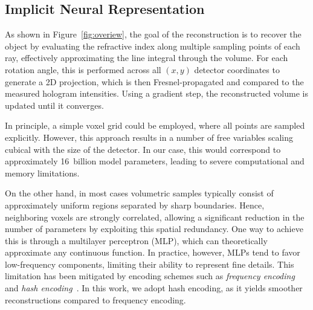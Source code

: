 \documentclass{article}
\begin{document}
\subsection{Implicit Neural Representation}
As shown in Figure~\ref{fig:overiew}, the goal of the reconstruction is to recover the object by evaluating the refractive index along multiple sampling points of each ray, effectively approximating the line integral through the volume. 
For each rotation angle, this is performed across all $\left( x,y \right)$ detector coordinates to generate a 2D projection, which is then Fresnel-propagated and compared to the measured hologram intensities.
Using a gradient step, the reconstructed volume is updated until it converges.

In principle, a simple voxel grid could be employed, where all points are sampled explicitly.  
However, this approach results in a number of free variables scaling cubical with the size of the detector.  
In our case, this would correspond to approximately 16~billion model parameters, leading to severe computational and memory limitations.  

On the other hand, in most cases volumetric samples typically consist of approximately uniform regions separated by sharp boundaries.  
Hence, neighboring voxels are strongly correlated, allowing a significant reduction in the number of parameters by exploiting this spatial redundancy.  
One way to achieve this is through a multilayer perceptron (MLP), which can theoretically approximate any continuous function.  
In practice, however, MLPs tend to favor low-frequency components, limiting their ability to represent fine details.  
This limitation has been mitigated by encoding schemes such as \emph{frequency encoding} and \emph{hash encoding}~\cite{mullerInstantNeuralGraphics2022,mildenhallNeRFRepresentingScenes2020a}.  
In this work, we adopt hash encoding, as it yields smoother reconstructions compared to frequency encoding.  
\end{document}
